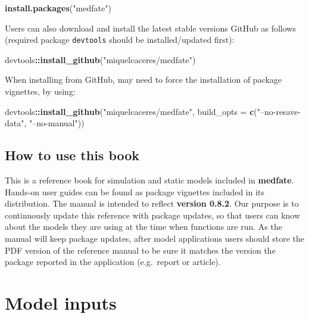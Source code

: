 \documentclass[]{book}
\newenvironment{Shaded}{\begin{snugshade}}{\end{snugshade}}
\newcommand{\KeywordTok}[1]{\textcolor[rgb]{0.13,0.29,0.53}{\textbf{#1}}}
\newcommand{\DataTypeTok}[1]{\textcolor[rgb]{0.13,0.29,0.53}{#1}}
\newcommand{\StringTok}[1]{\textcolor[rgb]{0.31,0.60,0.02}{#1}}
\newcommand{\OperatorTok}[1]{\textcolor[rgb]{0.81,0.36,0.00}{\textbf{#1}}}
\newcommand{\NormalTok}[1]{#1}
\begin{document}
\begin{Shaded}
\begin{Highlighting}[]
\KeywordTok{install.packages}\NormalTok{(}\StringTok{"medfate"}\NormalTok{)}
\end{Highlighting}
\end{Shaded}

Users can also download and install the latest stable versions GitHub as follows (required package \texttt{devtools} should be installed/updated first):

\begin{Shaded}
\begin{Highlighting}[]
\NormalTok{devtools}\OperatorTok{::}\KeywordTok{install_github}\NormalTok{(}\StringTok{"miquelcaceres/medfate"}\NormalTok{)}
\end{Highlighting}
\end{Shaded}

When installing from GitHub, may need to force the installation of package vignettes, by using:

\begin{Shaded}
\begin{Highlighting}[]
\NormalTok{devtools}\OperatorTok{::}\KeywordTok{install_github}\NormalTok{(}\StringTok{"miquelcaceres/medfate"}\NormalTok{, }
                         \DataTypeTok{build_opts =} \KeywordTok{c}\NormalTok{(}\StringTok{"--no-resave-data"}\NormalTok{, }\StringTok{"--no-manual"}\NormalTok{))}
\end{Highlighting}
\end{Shaded}

\hypertarget{how-to-use-this-book}{%
\section{How to use this book}\label{how-to-use-this-book}}

This is a reference book for simulation and static models included in \textbf{medfate}. Hands-on user guides can be found as package vignettes included in its distribution. The manual is intended to reflect \textbf{version 0.8.2}. Our purpose is to continuously update this reference with package updates, so that users can know about the models they are using at the time when functions are run. As the manual will keep package updates, after model applications users should store the PDF version of the reference manual to be sure it matches the version the package reported in the application (e.g.~report or article).

\hypertarget{model-inputs}{%
\chapter{Model inputs}\label{model-inputs}}
\end{document}
